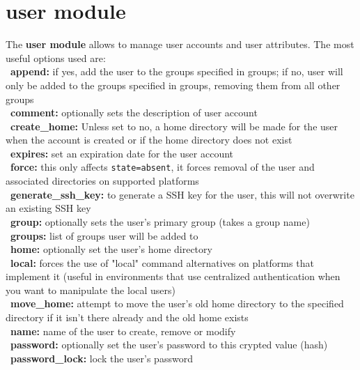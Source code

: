 \documentclass{refcard}
\begin{document}
\section{user module}

The \textbf{user module} allows to manage user accounts and user attributes. The most useful options used are:\\
\textbullet\ \textbf{append:} if yes, add the user to the groups specified in groups; if no, user will only be added to the groups specified in groups, removing them from all other groups\\
\textbullet\ \textbf{comment:} optionally sets the description of user account\\
\textbullet\ \textbf{create\_home:} Unless set to no, a home directory will be made for the user when the account is created or if the home directory does not exist\\
\textbullet\ \textbf{expires:} set an expiration date for the user account\\
\textbullet\ \textbf{force:} this only affects \verb|state=absent|, it forces removal of the user and associated directories on supported platforms\\
\textbullet\ \textbf{generate\_ssh\_key:} to generate a SSH key for the user, this will not overwrite an existing SSH key\\
\textbullet\ \textbf{group:} optionally sets the user's primary group (takes a group name)\\
\textbullet\ \textbf{groups:} list of groups user will be added to\\
\textbullet\ \textbf{home:} optionally set the user's home directory\\
\textbullet\ \textbf{local:} forces the use of "local" command alternatives on platforms that implement it (useful in environments that use centralized authentication when you want to manipulate the local users)\\
\textbullet\ \textbf{move\_home:} attempt to move the user's old home directory to the specified directory if it isn't there already and the old home exists\\
\textbullet\ \textbf{name:} name of the user to create, remove or modify\\
\textbullet\ \textbf{password:} optionally set the user's password to this crypted value (hash)\\
\textbullet\ \textbf{password\_lock:} lock the user's password\\
\end{document}
